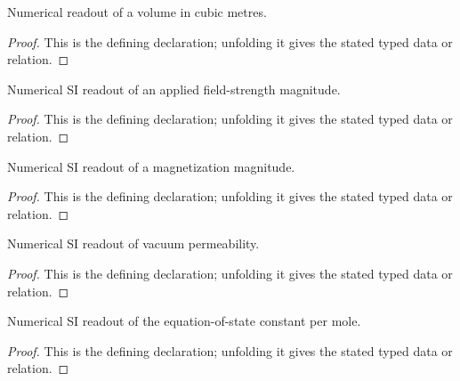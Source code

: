 \begin{definition}[volumeInCubicMeters]
  \label{decl:physics:IPhO_2026_3_B_2:volumeInCubicMeters}
  Numerical readout of a volume in cubic metres.
\end{definition}
\begin{proof}
  This is the defining declaration; unfolding it gives the stated typed data or relation.
\end{proof}

\begin{definition}[fieldStrengthInSI]
  \label{decl:physics:IPhO_2026_3_B_2:fieldStrengthInSI}
  Numerical SI readout of an applied field-strength magnitude.
\end{definition}
\begin{proof}
  This is the defining declaration; unfolding it gives the stated typed data or relation.
\end{proof}

\begin{definition}[magnetizationInSI]
  \label{decl:physics:IPhO_2026_3_B_2:magnetizationInSI}
  Numerical SI readout of a magnetization magnitude.
\end{definition}
\begin{proof}
  This is the defining declaration; unfolding it gives the stated typed data or relation.
\end{proof}

\begin{definition}[vacuumPermeabilityInSI]
  \label{decl:physics:IPhO_2026_3_B_2:vacuumPermeabilityInSI}
  Numerical SI readout of vacuum permeability.
\end{definition}
\begin{proof}
  This is the defining declaration; unfolding it gives the stated typed data or relation.
\end{proof}

\begin{definition}[curieConstantInSI]
  \label{decl:physics:IPhO_2026_3_B_2:curieConstantInSI}
  Numerical SI readout of the equation-of-state constant per mole.
\end{definition}
\begin{proof}
  This is the defining declaration; unfolding it gives the stated typed data or relation.
\end{proof}

